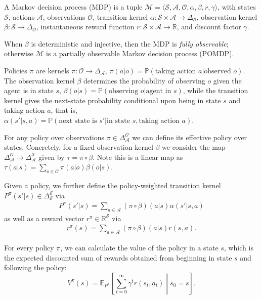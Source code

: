 \documentclass{article}
\theoremstyle{definition}
\theoremstyle{remark}
\newcommand{\sR}{\mathbb{R}}
\newcommand{\sP}{\mathbb{P}}
\begin{document}
A Markov decision process (MDP) is a tuple $\mathcal{M} = \langle \mathcal{S}, \mathcal A,\mathcal O,\alpha, \beta, r, \gamma \rangle$, with states $\mathcal S$, actions $\mathcal A$, observations $\mathcal O$, transition kernel $\alpha: \mathcal S \times \mathcal A \to \Delta_{\mathcal{S}}$, observation kernel $\beta: \mathcal S \to \Delta_{\mathcal{O}}$, instantaneous reward function $r: \mathcal S \times \mathcal A \to \sR$, and discount factor $\gamma$. 

When $\beta$ is deterministic and injective, then the MDP is \textit{fully observable}; otherwise $\mathcal{M}$ is a partially observable Markov decision process (POMDP). 

Policies $\pi$ are kernels $\pi\colon \mathcal O \to \Delta_{\mathcal A}$, $\pi(a | o) = \sP(\text{taking action } a | \text{observed } o)$. The observation kernel $\beta$ determines the probability of observing $o$ given the agent is in state $s$, $\beta(o | s) = \sP(\text{observing } o | \text{agent in } s)$, while the transition kernel gives the next-state probability conditional upon being in state $s$ and taking action $a$, that is, $\alpha(s'|s, a) = \sP(\text{next state is } s' | \text{in state } s, \text{taking action } a)$. 

For any policy over observations $\pi\in \Delta^{\mathcal O}_{\mathcal A}$ we can define its effective policy over states. Concretely, for a fixed observation kernel $\beta$ we consider the map $\Delta^{\mathcal O}_{\mathcal A} \to \Delta^{\mathcal S}_{\mathcal A}$ given by $\tau = \pi \circ \beta$. 
Note this is a linear map as $\tau(a|s) = \sum_{o\in \mathcal O} \pi(a|o)\beta(o|s)$. 

Given a policy, we further define the policy-weighted transition kernel $P^\pi(s'|s) \in \Delta^{\mathcal S}_{\mathcal S}$ via 
\begin{align}
    P^\pi(s'|s) = \sum_{a \in \mathcal A} (\pi \circ \beta)(a|s)\alpha(s'|s,a)
    \label{eq:transition-kernel}
\end{align} 
as well as a reward vector $r^\pi \in \mathbb{R}^{\mathcal S}$ via 
\begin{align}
    r^\pi(s) = \sum_{a\in \mathcal A} (\pi \circ \beta)(a|s)r(s,a). 
    \label{eq:reward-vector}
\end{align}

For every policy $\pi$, we can calculate the value of the policy in a state $s$, which is the expected discounted sum of rewards obtained from beginning in state $s$ and following the policy: 
%
\begin{equation*}
    V^{\pi}(s) = \mathbb{E}_{P^{\pi}}\left [\sum_{t=0}^\infty \gamma^t r(s_t, a_t) \middle | s_0 =s  \right ]. 
\end{equation*}
\end{document}
